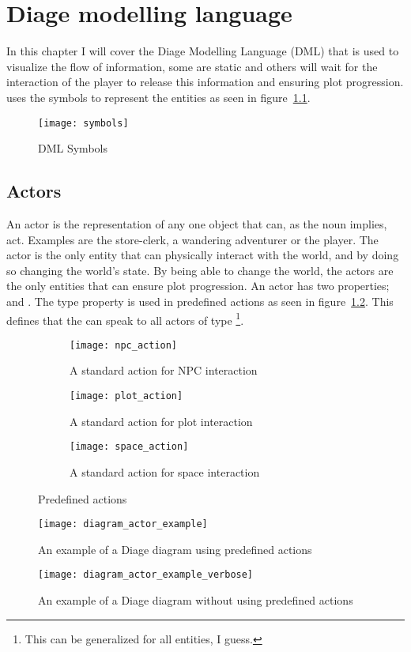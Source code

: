 
\chapter{Diage modelling language}
In this chapter I will cover the Diage Modelling Language (DML) that is used to visualize the flow of information, some are static and others will wait for the interaction of the player to release this information and ensuring plot progression. \diage uses the symbols to represent the \diage entities as seen in figure~\ref{fig:DMLSymbols}. 

\begin{figure}[h]
	\texttt{[image: symbols]}
	\caption{DML Symbols}
	\label{fig:DMLSymbols}	
\end{figure}

\section{Actors}
An actor is the representation of any one object that can, as the noun implies, act. Examples are the store-clerk, a wandering adventurer or the player. The actor is the only entity that can physically interact with the world, and by doing so changing the world's state. By being able to change the world, the actors are the only entities that can ensure plot progression. An actor has two properties;  and . The type property is used in predefined actions as seen in figure~\ref{fig:actions:npc}. This defines that the  can speak to all actors of type \footnote{This can be generalized for all entities, I guess.}. 


\begin{figure}[ht]
	\centering
	\begin{subfigure}[b]{0.3\textwidth}
		\texttt{[image: npc\_action]}
		\caption{A standard action for NPC interaction}\label{fig:actions:npc}
	\end{subfigure}
	\begin{subfigure}[b]{0.3\textwidth}
		\texttt{[image: plot\_action]}
		\caption{A standard action for plot interaction}\label{fig:actions:plot}
	\end{subfigure}
	\begin{subfigure}[b]{0.3\textwidth}
		\texttt{[image: space\_action]}
		\caption{A standard action for space interaction}\label{fig:actions:space}
	\end{subfigure}
	\caption{Predefined actions}\label{fig:actions}
\end{figure}

\begin{figure}[ht]
	\texttt{[image: diagram\_actor\_example]}
	\caption{An example of a Diage diagram using predefined actions}\label{fig:examplediagram}
\end{figure}



\begin{figure}
	\texttt{[image: diagram\_actor\_example\_verbose]}
	\caption{An example of a Diage diagram without using predefined actions}\label{fig:examplediagramverbose}
\end{figure}
